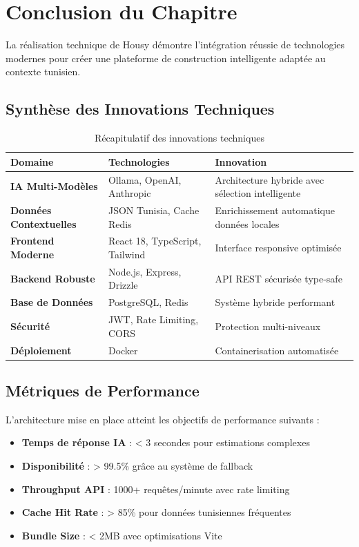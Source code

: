 \section{Conclusion du Chapitre}

La réalisation technique de Housy démontre l'intégration réussie de technologies modernes pour créer une plateforme de construction intelligente adaptée au contexte tunisien.

\subsection{Synthèse des Innovations Techniques}

\begin{table}[H]
\centering
\caption{Récapitulatif des innovations techniques}
\label{tab:innovations_techniques}
\begin{tabular}{|p{3cm}|p{4cm}|p{4cm}|}
\hline
\textbf{Domaine} & \textbf{Technologies} & \textbf{Innovation} \\
\hline
\textbf{IA Multi-Modèles} & Ollama, OpenAI, Anthropic & Architecture hybride avec sélection intelligente \\
\hline
\textbf{Données Contextuelles} & JSON Tunisia, Cache Redis & Enrichissement automatique données locales \\
\hline
\textbf{Frontend Moderne} & React 18, TypeScript, Tailwind & Interface responsive optimisée \\
\hline
\textbf{Backend Robuste} & Node.js, Express, Drizzle & API REST sécurisée type-safe \\
\hline
\textbf{Base de Données} & PostgreSQL, Redis & Système hybride performant \\
\hline
\textbf{Sécurité} & JWT, Rate Limiting, CORS & Protection multi-niveaux \\
\hline
\textbf{Déploiement} & Docker & Containerisation automatisée \\
\hline
\end{tabular}
\end{table}

\subsection{Métriques de Performance}

L'architecture mise en place atteint les objectifs de performance suivants :
\begin{itemize}
    \item \textbf{Temps de réponse IA} : < 3 secondes pour estimations complexes
    \item \textbf{Disponibilité} : > 99.5\% grâce au système de fallback
    \item \textbf{Throughput API} : 1000+ requêtes/minute avec rate limiting
    \item \textbf{Cache Hit Rate} : > 85\% pour données tunisiennes fréquentes
    \item \textbf{Bundle Size} : < 2MB avec optimisations Vite
\end{itemize}

